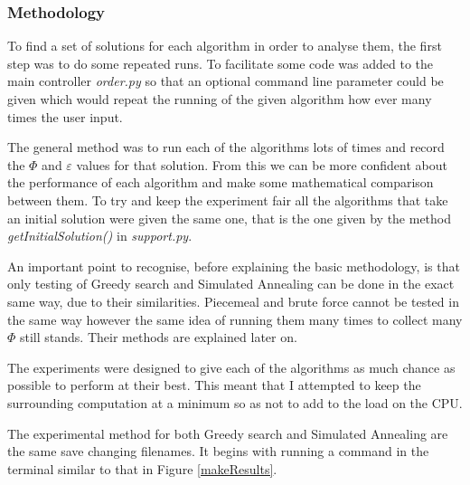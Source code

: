 \documentclass[12pt]{report}
\begin{document}
\subsubsection{Methodology}
To find a set of solutions for each algorithm in order to analyse them, the first step was to do some repeated runs. To facilitate some code was added to the main controller \textit{order.py} so that an optional command line parameter could be given which would repeat the running of the given algorithm how ever many times the user input. 

The general method was to run each of the algorithms lots of times and record the $\Phi$ and $\varepsilon$ values for that solution. From this we can be more confident about the performance of each algorithm and make some mathematical comparison between them. To try and keep the experiment fair all the algorithms that take an initial solution were given the same one, that is the one given by the method \textit{getInitialSolution()} in \textit{support.py}.

An important point to recognise, before explaining the basic methodology, is that only testing of Greedy search and Simulated Annealing can be done in the exact same way, due to their similarities. Piecemeal and brute force cannot be tested in the same way however the same idea of running them many times to collect many $\Phi$ still stands. Their methods are explained later on.

The experiments were designed to give each of the algorithms as much chance as possible to perform at their best. This meant that I attempted to keep the surrounding computation at a minimum so as not to add to the load on the CPU.

The experimental method for both Greedy search and Simulated Annealing are the same save changing filenames. It begins with running a command in the terminal similar to that in Figure \ref{makeResults}.
\end{document}
